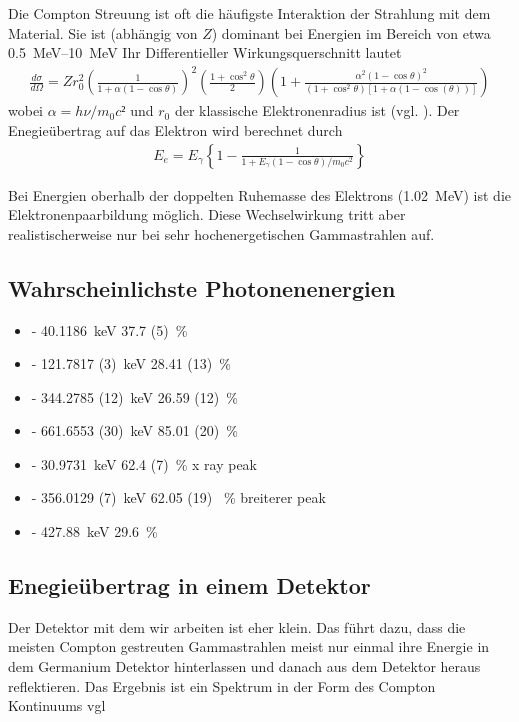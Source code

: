 Die Compton Streuung ist oft die häufigste Interaktion der Strahlung mit dem Material.
Sie ist (abhängig von $Z$) dominant bei Energien im Bereich von etwa \qtyrange{0.5}{10}{\MeV}
Ihr Differentieller Wirkungsquerschnitt lautet
\begin{align}
    \frac{d\sigma}{d \Omega} = Z r_0^2 \left(\frac{1}{1+\alpha(1-\cos\theta)}\right)^2 %
    \left(\frac{1+ \cos^2\theta}{2}\right)%
    \left(1+ \frac{\alpha^2(1-\cos \theta)^2}{(1+\cos^2 \theta)[1+\alpha(1-\cos(\theta))]}\right)
    \label{eq:wq_compton}
\end{align}%
wobei $\alpha = h \nu / m_0 c²$ und $r_0$ der klassische Elektronenradius ist (vgl. \cite{book:knoll}).
Der Enegieübertrag auf das Elektron wird berechnet durch
\begin{align}
    E_{e} = E_{\gamma} \left\{1- \frac{1}{1+ E_{\gamma}(1-\cos\theta)/m_0 c^2} \right\}
    \label{eq:ecompton}
\end{align} 


Bei Energien oberhalb der doppelten Ruhemasse des Elektrons (\qty{1.02}{\MeV}) ist die Elektronenpaarbildung möglich.
Diese Wechselwirkung tritt aber realistischerweise nur bei sehr hochenergetischen Gammastrahlen auf.


\subsection{Wahrscheinlichste Photonenenergien}
\begin{itemize} 
    \item[\ce   {^{152}Eu}] - \qty{ 40.1186 } {\keV} \qty{37.7 (5)}{\%} 
    \item[\ce   {^{152}Eu}] - \qty{121.7817 (3)} {\keV} \qty{28.41 (13)}{\%} 
    \item[\ce   {^{152}Eu}] - \qty{344.2785 (12)} {\keV} \qty{26.59 (12)}{\%}
    \item[\ce   {^{137}Cs}] - \qty{661.6553 (30)} {\keV} \qty{85.01 (20)}{\%}
    \item[\ce   {^{133}Ba}] - \qty{30.9731}{\keV} \qty{62.4 (7)}{\%} x ray peak
    \item[\ce   {^{133}Ba}] - \qty{356.0129 (7)}{\keV} \qty{62.05 (19) 	}{\%} breiterer peak
    \item[\ce   {^{125}Sb}] - \qty{427.88}{\keV} \qty{29.6}{\%}
\end{itemize}
\cite{web:lara}

\subsection{Enegieübertrag in einem Detektor}
Der Detektor mit dem wir arbeiten ist eher klein.
Das führt dazu, dass die meisten Compton gestreuten Gammastrahlen meist nur einmal ihre Energie in dem
Germanium Detektor hinterlassen und danach aus dem Detektor heraus reflektieren.
Das Ergebnis ist ein Spektrum in der Form des Compton Kontinuums vgl

